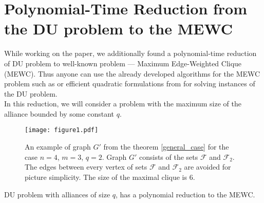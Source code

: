 \documentclass[smallextended]{svjour3}       %
\begin{document}
\section{Polynomial-Time Reduction from the DU problem to the MEWC}
While working on the paper, we additionally found a polynomial-time reduction of DU problem to well-known problem --- Maximum Edge-Weighted Clique (MEWC).  Thus anyone can use the already developed algorithms for the MEWC problem such as \cite{san2019new} or efficient quadratic formulations from \cite{hosseinian2017maximum} for solving instances of the DU problem.\\
In this reduction, we will consider a problem with the maximum size of the alliance bounded by some constant $q$. 

\begin{figure}[h!]
\begin{center}
\texttt{[image: figure1.pdf]}
\caption{An example of graph $G'$ from the theorem \ref{general_case}  for the case $n=4$, $m=3$, $q=2$.  Graph $G'$ consists of the sets $\mathcal{F}$ and $\mathcal{F}_2$. The edges between every vertex of sets $\mathcal{F}$ and $\mathcal{F}_2$ are avoided for picture simplicity. The size of the maximal clique is 6. }
\label{fig:reduction}
\end{center}
\end{figure}

\begin{theorem}
\label{general_case}
    DU problem with alliances of size $q$, has a polynomial reduction to the MEWC.
\end{theorem}
\end{document}
